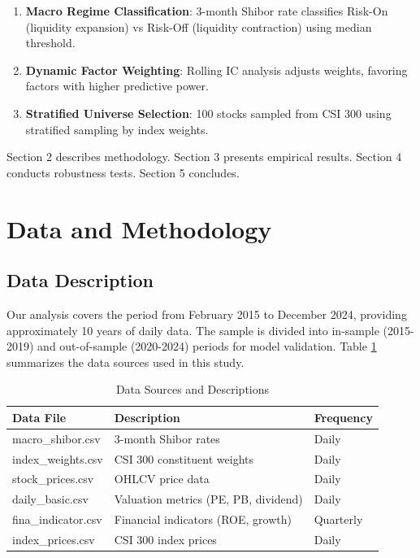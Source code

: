 \documentclass[12pt,a4paper]{article}
\begin{document}
\begin{enumerate}
    \item \textbf{Macro Regime Classification}: 3-month Shibor rate classifies Risk-On (liquidity expansion) vs Risk-Off (liquidity contraction) using median threshold.
    \item \textbf{Dynamic Factor Weighting}: Rolling IC analysis adjusts weights, favoring factors with higher predictive power.
    \item \textbf{Stratified Universe Selection}: 100 stocks sampled from CSI 300 using stratified sampling by index weights.
\end{enumerate}

Section 2 describes methodology. Section 3 presents empirical results. Section 4 conducts robustness tests. Section 5 concludes.

\section{Data and Methodology}

\subsection{Data Description}

Our analysis covers the period from February 2015 to December 2024, providing approximately 10 years of daily data. The sample is divided into in-sample (2015-2019) and out-of-sample (2020-2024) periods for model validation. Table \ref{tab:data_sources} summarizes the data sources used in this study.

\begin{table}[H]
\centering
\caption{Data Sources and Descriptions}
\label{tab:data_sources}
\begin{tabular}{@{}lll@{}}
\toprule
\textbf{Data File} & \textbf{Description} & \textbf{Frequency} \\
\midrule
macro\_shibor.csv & 3-month Shibor rates & Daily \\
index\_weights.csv & CSI 300 constituent weights & Daily \\
stock\_prices.csv & OHLCV price data & Daily \\
daily\_basic.csv & Valuation metrics (PE, PB, dividend) & Daily \\
fina\_indicator.csv & Financial indicators (ROE, growth) & Quarterly \\
index\_prices.csv & CSI 300 index prices & Daily \\
\bottomrule
\end{tabular}
\end{table}
\end{document}
